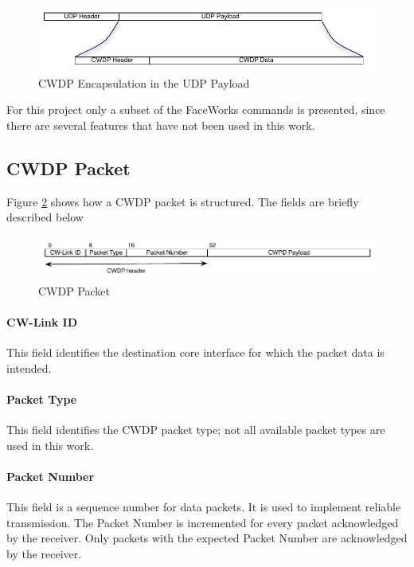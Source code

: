 \documentclass[defaultstyle,10pt,master,Helvetica]{thesis}
\begin{document}
\begin{figure}[h]
  \centering
      \includegraphics[scale=1]{Diagrams/CWDP-Encap.pdf}
  \caption{\ac{CWDP} Encapsulation in the \ac{UDP} Payload}\label{fig:cwdp-encap}
\end{figure}

For this project only a subset of the FaceWorks commands is presented, since there are several features that have not been used in this work.

\subsection{CWDP Packet}

Figure \ref{fig:cwdp-packet} shows how a \ac{CWDP} packet is structured. The fields are briefly described below

\begin{figure}[h]
  \centering
      \includegraphics[scale=1]{Diagrams/CWDP-Packet.pdf}
  \caption{\ac{CWDP} Packet}\label{fig:cwdp-packet}
\end{figure}

\paragraph*{CW-Link ID} This field identifies the destination core interface for which the packet data is intended.
\paragraph*{Packet Type} This field identifies the CWDP packet type; not all available packet types are used in this work.
\paragraph*{Packet Number} This field is a sequence number for data packets. It is used to implement reliable transmission. The Packet Number is incremented for every packet acknowledged by the receiver. Only packets with the expected Packet Number are acknowledged by the receiver.
\end{document}
